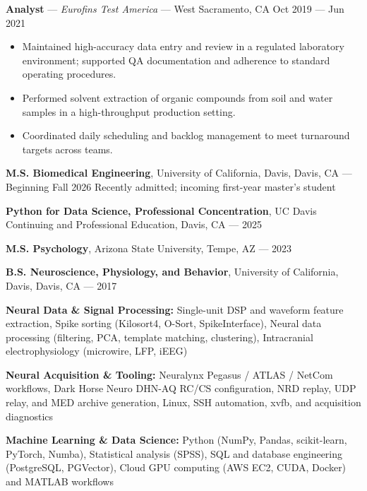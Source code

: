 \documentclass[11pt]{article}
\providecommand{\tightlist}{\setlength{\itemsep}{0pt}\setlength{\parskip}{0pt}}
\renewcommand{\subsection}[1]{\par\medskip\noindent{\sffamily\bfseries\fontsize{11pt}{0}\selectfont #1}\par\smallskip}
\begin{document}
\textbf{Analyst} --- \emph{Eurofins Test America} --- West Sacramento,
CA Oct 2019 --- Jun 2021

\begin{itemize}
\tightlist
\item
  Maintained high-accuracy data entry and review in a regulated
  laboratory environment; supported QA documentation and adherence to
  standard operating procedures.
\item
  Performed solvent extraction of organic compounds from soil and water
  samples in a high-throughput production setting.
\item
  Coordinated daily scheduling and backlog management to meet turnaround
  targets across teams.
\end{itemize}

\subsection{Education}\label{education}

\textbf{M.S. Biomedical Engineering}, University of California, Davis,
Davis, CA --- Beginning Fall 2026 Recently admitted; incoming first-year
master's student

\textbf{Python for Data Science, Professional Concentration}, UC Davis
Continuing and Professional Education, Davis, CA --- 2025

\textbf{M.S. Psychology}, Arizona State University, Tempe, AZ --- 2023

\textbf{B.S. Neuroscience, Physiology, and Behavior}, University of
California, Davis, Davis, CA --- 2017

\subsection{Skills}\label{skills}

\textbf{Neural Data \& Signal Processing:} Single-unit DSP and waveform
feature extraction, Spike sorting (Kilosort4, O-Sort, SpikeInterface),
Neural data processing (filtering, PCA, template matching, clustering),
Intracranial electrophysiology (microwire, LFP, iEEG)

\textbf{Neural Acquisition \& Tooling:} Neuralynx Pegasus / ATLAS /
NetCom workflows, Dark Horse Neuro DHN-AQ RC/CS configuration, NRD
replay, UDP relay, and MED archive generation, Linux, SSH automation,
xvfb, and acquisition diagnostics

\textbf{Machine Learning \& Data Science:} Python (NumPy, Pandas,
scikit-learn, PyTorch, Numba), Statistical analysis (SPSS), SQL and
database engineering (PostgreSQL, PGVector), Cloud GPU computing (AWS
EC2, CUDA, Docker) and MATLAB workflows
\end{document}
